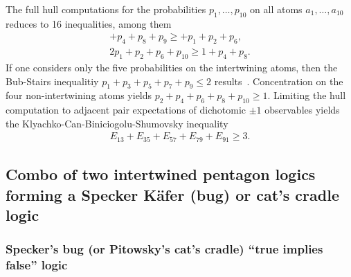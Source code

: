 \documentclass[%
  twocolumn,
 showpacs,
 showkeys,
 preprintnumbers,
 amsmath,amssymb,
 aps,
  pra,
  longbibliography,
 floatfix,
 ]{revtex4-1}
\begin{document}
The full hull computations for the probabilities $p_1, \ldots , p_{10}$
on all atoms $a_1, \ldots , a_{10}$
reduces to 16 inequalities, among them
\begin{equation}
\begin{split}
      + p_4              + p_8  + p_9               \ge          + p_1 + p_2    +p_6,       \\
   2p_1 + p_2             + p_6                + p_{10}     \ge           1  + p_4   + p_8.
\label{2017-b-completepp}
\end{split}
\end{equation}
If one considers only the five probabilities on the intertwining atoms,
then the Bub-Stairs inequalitiy
$p_1+p_3+p_5+p_7+p_9 \le 2$
results~\cite{Bub-2009,Bub-2010,Badziag-2011}.
Concentration on the four non-intertwining atoms yields $p_2+p_4+p_6+p_8+p_{10} \ge 1$.
Limiting the hull computation to adjacent pair expectations of dichotomic $\pm 1$ observables
yields the Klyachko-Can-Biniciogolu-Shumovsky inequality~\cite{Klyachko-2008}
\begin{equation}
\begin{split}
E_{13}  + E_{35}  + E_{57}  + E_{79}  + E_{91}   \ge 3
.
\end{split}
\label{2017-b-klyacbs}
\end{equation}


\subsection{Combo of two intertwined pentagon logics forming a Specker K\"afer (bug) or cat's cradle logic}
\label{2017-b-speckerbug}

%



\subsubsection{Specker's bug (or Pitowsky's cat's cradle) ``true implies false'' logic}
\end{document}
